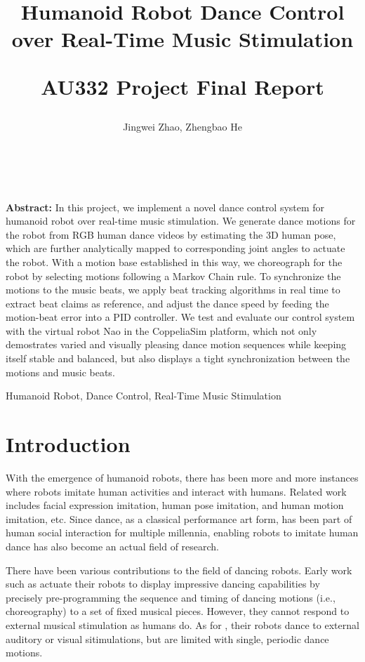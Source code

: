 \documentclass[UTF8,a4paper]{article}
\title{Humanoid Robot Dance Control \\ over Real-Time Music Stimulation \\ [1ex] \begin{large} AU332 Project Final Report \end{large} }
\author{%
	{Jingwei Zhao,  Zhengbao He}\\
	\affaddr{Shanghai Jiao Tong University, Shanghai, China}\\
	\affaddr{\{zhaojw, lstefanie\}@sjtu.edu.cn}\\
}
\newenvironment{csmtAbstract}{\noindent \kaishu \small {\bfseries Abstract:}}{}
\newenvironment{keywords}{\small \noindent{\bfseries Key Words:}}{}
\begin{document}
	
	\maketitle
	
	\begin{csmtAbstract}
		In this project, we implement a novel dance control system for humanoid robot over real-time music stimulation. We generate dance motions for the robot from RGB human dance videos by estimating the 3D human pose, which are further analytically mapped to corresponding joint angles to actuate the robot. With a motion base established in this way, we choreograph for the robot by selecting motions following a Markov Chain rule. To synchronize the motions to the music beats, we apply beat tracking algorithms in real time to extract beat claims as reference, and adjust the dance speed by feeding the motion-beat error into a PID controller. We test and evaluate our control system with the virtual robot Nao in the CoppeliaSim platform, which not only demostrates varied and visually pleasing dance motion sequences while keeping itself stable and balanced, but also displays a tight synchronization between the motions and music beats.
	\end{csmtAbstract}
	
	\begin{keywords}
		Humanoid Robot, Dance Control, Real-Time Music Stimulation
	\end{keywords}
	
	\section{Introduction}
	
	\noindent With the emergence of humanoid robots, there has been more and more instances where robots imitate human activities and interact with humans. Related work includes facial expression imitation\cite{ge2008facial}, human pose imitation\cite{zhang2018real, lei2015whole, zhangreal}, and human motion imitation\cite{kim2009stable, nakaoka2003generating, koenemann2014real}, etc. Since dance, as a classical performance art form, has been part of human social interaction for multiple millennia, enabling robots to imitate human dance has also become an actual field of research.

	There have been various contributions to the field of dancing robots. Early work such as \cite{geppert2004qrio, nakaoka2005task} actuate their robots to display impressive dancing capabilities by precisely pre-programming the sequence and timing of dancing motions (i.e., choreography) to a set of fixed musical pieces. However, they cannot respond to external musical stimulation as humans do. As for \cite{crick2006synchronization, bock2016robod, murata2008robot, schollig2010synchronizing}, their robots dance to external auditory or visual sitimulations, but are limited with single, periodic dance motions. 
	
\end{document}
